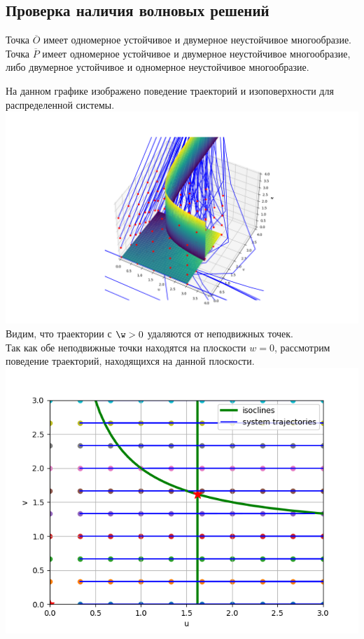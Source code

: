 \documentclass[oneside, final, 12pt]{article}
\begin{document}
\subsection{Проверка наличия волновых решений}
Точка \(\overline{O}\) имеет одномерное устойчивое и двумерное неустойчивое многообразие.
Точка \(\overline{P}\) имеет одномерное устойчивое и двумерное неустойчивое многообразие, либо двумерное устойчивое и одномерное неустойчивое многообразие.

На данном графике изображено поведение траекторий и изоповерхности для распределенной системы. \\

\includegraphics[width=1\textwidth]{Figure_11.png}\\

Видим, что траектории с \(\w>0\) удаляются от неподвижных точек.\\

Так как обе неподвижные точки находятся на плоскости \(w=0\), рассмотрим поведение траекторий, находящихся на данной плоскости.\\

\includegraphics[width=1\textwidth]{Figure_13.png}\\
\end{document}
